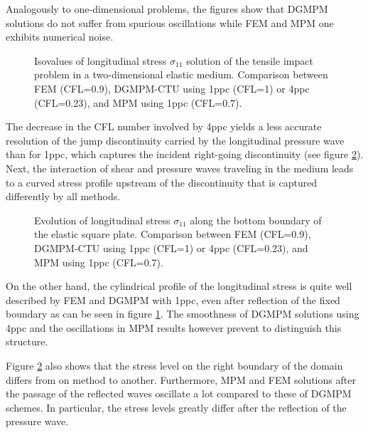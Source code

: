 Analogously to one-dimensional problems, the figures show that DGMPM solutions do not suffer from spurious oscillations while FEM and MPM one exhibits numerical noise.
\begin{figure}[h!]
  \centering
  
  \caption{Isovalues of longitudinal stress $\sigma_{11}$ solution of the tensile impact problem in a two-dimensional elastic medium. Comparison between FEM (CFL=0.9), DGMPM-CTU using 1ppc (CFL=1) or 4ppc (CFL=0.23), and MPM using 1ppc (CFL=0.7).}
  \label{fig:2delast_comparison}
\end{figure}
The decrease in the CFL number involved by 4ppc yields a less accurate resolution of the jump discontinuity carried by the longitudinal pressure wave than for 1ppc, which captures the incident right-going discontinuity (see figure \ref{fig:elastlines}).
Next, the interaction of shear and pressure waves traveling in the medium leads to a curved stress profile upstream of the discontinuity that is captured differently by all methods.  
\begin{figure}[h!]
  { \label{subfig:line_elast1}}
  { \label{subfig:line_elast2}}
  
  \caption{Evolution of longitudinal stress $\sigma_{11}$ along the bottom boundary of the elastic square plate. Comparison between FEM (CFL=0.9), DGMPM-CTU using 1ppc (CFL=1) or 4ppc (CFL=0.23), and MPM using 1ppc (CFL=0.7).}
  \label{fig:elastlines}
\end{figure}
On the other hand, the cylindrical profile of the longitudinal stress is quite well described by FEM and DGMPM with 1ppc, even after reflection of the fixed boundary as can be seen in figure \ref{fig:2delast_comparison}. The smoothness of DGMPM solutions using 4ppc and the oscillations in MPM results however prevent to distinguish this structure.

Figure \ref{fig:elastlines} also shows that the stress level on the right boundary of the domain differs from on method to another. Furthermore, MPM and FEM solutions after the passage of the reflected waves oscillate a lot compared to these of DGMPM schemes. In particular, the stress levels greatly differ after the reflection of the pressure wave.


